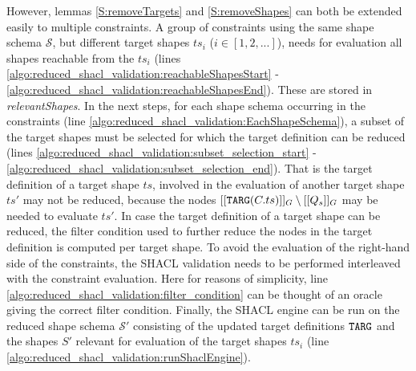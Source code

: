 However, lemmas \ref{S:removeTargets} and \ref{S:removeShapes} can both be extended easily to multiple constraints.
A group of constraints using the same shape schema $\mathcal{S}$, but different target shapes $ts_i$ ($i \in [1,2,...]$), needs for evaluation all shapes reachable from the $ts_i$ (lines \ref{algo:reduced_shacl_validation:reachableShapesStart} - \ref{algo:reduced_shacl_validation:reachableShapesEnd}). These are stored in \textit{relevantShapes}. In the next steps, for each shape schema occurring in the constraints (line \ref{algo:reduced_shacl_validation:EachShapeSchema}), a subset of the target shapes must be selected for which the target definition can be reduced (lines \ref{algo:reduced_shacl_validation:subset_selection_start} - \ref{algo:reduced_shacl_validation:subset_selection_end}). That is the target definition of a target shape $ts$, involved in the evaluation of another target shape $ts'$ may not be reduced, because the nodes $[[\texttt{TARG}(C.ts)]]_G \setminus [[Q_s]]_G$ may be needed to evaluate $ts'$. In case the target definition of a target shape can be reduced, the filter condition used to further reduce the nodes in the target definition is computed per target shape. To avoid the evaluation of the right-hand side of the constraints, the SHACL validation needs to be performed interleaved with the constraint evaluation. Here for reasons of simplicity, line  \ref{algo:reduced_shacl_validation:filter_condition} can be thought of an oracle giving the correct filter condition.
Finally, the SHACL engine can be run on the reduced shape schema $\mathcal{S}'$ consisting of the updated target definitions $\texttt{TARG}$ and the shapes $S'$ relevant for evaluation of the target shapes $ts_i$ (line \ref{algo:reduced_shacl_validation:runShaclEngine}).
